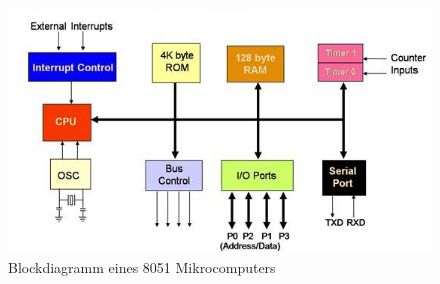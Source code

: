 \begin{figure}[htbp]
	\centering
	\includegraphics[scale=0.75]{img/8051-diagram}
	\caption{Blockdiagramm eines 8051 Mikrocomputers}
	\label{img:8051}
\end{figure}
